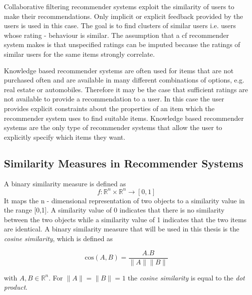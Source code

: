 \noindent Collaborative filtering recommender systems exploit the similarity of users to make their recommendations. Only
implicit or explicit feedback provided by the users is used in this case. The goal is to find clusters of similar users i.e.
users whose rating - behaviour is similar. The assumption that a \acrshort{cf} recommender system makes is that
unspecified ratings can be imputed because the ratings of similar users for the same items strongly correlate.

\noindent Knowledge based recommender systems are often used for items that are not purchased often and are available in many different combinations of options, e.g. real estate or automobiles. Therefore it may be the case that sufficient ratings are not available to provide a recommendation to a user. In this case the user provides explicit constraints about the properties of an item which the recommender system uses to find suitable items. Knowledge based recommender systems are the only type of recommender systems that allow the user to explicitly specify which items they want.

\subsection{Similarity Measures in Recommender Systems}

A binary similarity measure is defined as \begin{equation}
    f\colon\mathbb{R}^{n}\times\mathbb{R}^{n}\to [0,1]
\end{equation}
It maps the n - dimensional representation of two objects to a similarity value in the range [0,1]. A similarity value of 0 indicates that there is no similarity between the two objects while a similarity value of 1 indicates that the two items are identical. 
A binary similarity measure that will be used in this thesis is the \textit{cosine similarity}, which is defined as
\begin{center}
\begin{equation}
    \text{cos}(A, B) = \frac{A.B}{\|A\|\|B\|}
\end{equation}
\end{center}
with $A, B \in\mathbb{R}^{n}$. For $\|A\| = \|B\| = 1$ the \textit{cosine similarity} is equal to the \textit{dot product}.

